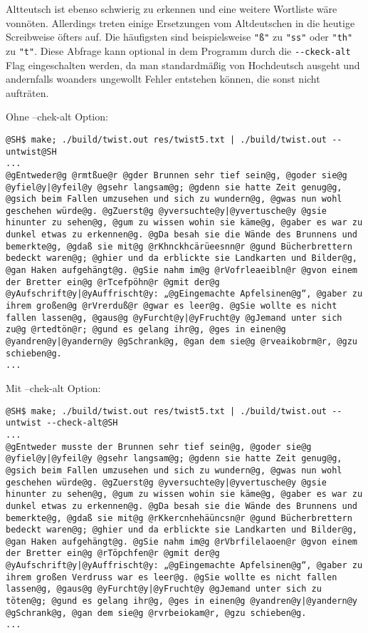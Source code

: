 \documentclass[a4paper,10pt,ngerman]{scrartcl}
\begin{document}
Altteutsch ist ebenso schwierig zu erkennen und eine weitere Wortliste wäre vonnöten. Allerdings treten einige Ersetzungen vom Altdeutschen in die heutige Screibweise öfters auf. Die häufigsten sind beispielsweise \lstinline{"ß"} zu \lstinline{"ss"} oder \lstinline{"th"} zu \lstinline{"t"}. Diese Abfrage kann optional in dem Programm durch die \lstinline{--ckeck-alt} Flag eingeschalten werden, da man standardmäßig von Hochdeutsch ausgeht und andernfalls woanders ungewollt Fehler entstehen können, die sonst nicht aufträten.

Ohne --chek-alt Option:
\begin{lstlisting}
@SH$ make; ./build/twist.out res/twist5.txt | ./build/twist.out --untwist@SH
...
@gEntweder@g @rmtßue@r @gder Brunnen sehr tief sein@g, @goder sie@g @yfiel@y|@yfeil@y @gsehr langsam@g; @gdenn sie hatte Zeit genug@g, @gsich beim Fallen umzusehen und sich zu wundern@g, @gwas nun wohl geschehen würde@g. @gZuerst@g @yversuchte@y|@yvertusche@y @gsie hinunter zu sehen@g, @gum zu wissen wohin sie käme@g, @gaber es war zu dunkel etwas zu erkennen@g. @gDa besah sie die Wände des Brunnens und bemerkte@g, @gdaß sie mit@g @rKhnckhcärüeesnn@r @gund Bücherbrettern bedeckt waren@g; @ghier und da erblickte sie Landkarten und Bilder@g, @gan Haken aufgehängt@g. @gSie nahm im@g @rVofrleaeibln@r @gvon einem der Bretter ein@g @rTcefpöhn@r @gmit der@g @yAufschrift@y|@yAuffrischt@y: „@gEingemachte Apfelsinen@g“, @gaber zu ihrem großen@g @rVrerduß@r @gwar es leer@g. @gSie wollte es nicht fallen lassen@g, @gaus@g @yFurcht@y|@yFrucht@y @gJemand unter sich zu@g @rtedtön@r; @gund es gelang ihr@g, @ges in einen@g @yandren@y|@yandern@y @gSchrank@g, @gan dem sie@g @rveaikobrm@r, @gzu schieben@g.
...
\end{lstlisting}

Mit --chek-alt Option:
\begin{lstlisting}
@SH$ make; ./build/twist.out res/twist5.txt | ./build/twist.out --untwist --check-alt@SH
...
@gEntweder musste der Brunnen sehr tief sein@g, @goder sie@g @yfiel@y|@yfeil@y @gsehr langsam@g; @gdenn sie hatte Zeit genug@g, @gsich beim Fallen umzusehen und sich zu wundern@g, @gwas nun wohl geschehen würde@g. @gZuerst@g @yversuchte@y|@yvertusche@y @gsie hinunter zu sehen@g, @gum zu wissen wohin sie käme@g, @gaber es war zu dunkel etwas zu erkennen@g. @gDa besah sie die Wände des Brunnens und bemerkte@g, @gdaß sie mit@g @rKkercnhehäüncsn@r @gund Bücherbrettern bedeckt waren@g; @ghier und da erblickte sie Landkarten und Bilder@g, @gan Haken aufgehängt@g. @gSie nahm im@g @rVbrfilelaoen@r @gvon einem der Bretter ein@g @rTöpchfen@r @gmit der@g @yAufschrift@y|@yAuffrischt@y: „@gEingemachte Apfelsinen@g“, @gaber zu ihrem großen Verdruss war es leer@g. @gSie wollte es nicht fallen lassen@g, @gaus@g @yFurcht@y|@yFrucht@y @gJemand unter sich zu töten@g; @gund es gelang ihr@g, @ges in einen@g @yandren@y|@yandern@y @gSchrank@g, @gan dem sie@g @rvrbeiokam@r, @gzu schieben@g.
...
\end{lstlisting}
\end{document}
